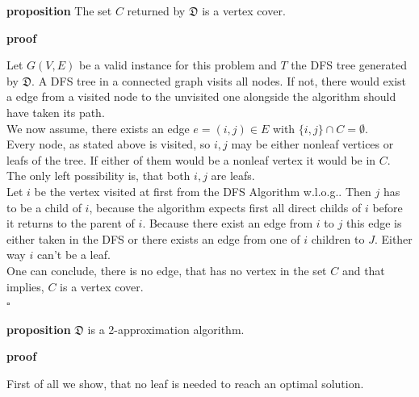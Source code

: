 \documentclass[11pt,a4paper,ngerman]{article}
\begin{document}
\begin{description}
	\item{\bfseries proposition} The set $C$ returned by $\mathfrak{D}$ is a vertex cover.
	\item{\bfseries proof}

Let $G(V,E)$ be a valid instance for this problem and $T$ the DFS tree generated by $\mathfrak{D}$. A DFS tree in a connected graph visits all nodes. If not, there would exist a edge from a visited node to the unvisited one alongside the algorithm should have taken its path.\\

We now assume, there exists an edge $e=(i,j)\in E$ with $\{i , j\} \cap C = \emptyset$.\\
Every node, as stated above is visited, so $i,j$ may be either nonleaf vertices or leafs of the tree. If either of them would be a nonleaf vertex it would be in $C$. The only left possibility is, that both $i,j$ are leafs.\\
Let $i$ be the vertex visited at first from the DFS Algorithm w.l.o.g.. Then $j$ has to be a child of $i$, because the algorithm expects first all direct childs of $i$ before it returns to the parent of $i$. Because there exist an edge from $i$ to $j$ this edge is either taken in the DFS or there exists an edge from one of $i$ children to $J$. Either way $i$ can't be a leaf.\\

One can conclude, there is no edge, that has no vertex in the set $C$ and that implies, $C$ is a vertex cover.\\
\mbox{} \hfill $\square$  

	\item{\bfseries proposition} $\mathfrak{D}$ is a 2-approximation algorithm.
	\item{\bfseries proof} 

First of all we show, that no leaf is needed to reach an optimal solution.

\end{description}

\label{LastPage}
\end{document}
